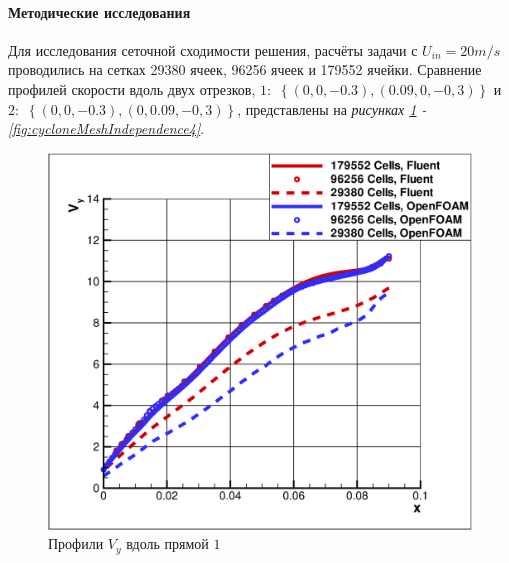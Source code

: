   \paragraph{Методические исследования\\}

  Для исследования сеточной сходимости решения, расчёты задачи с  $U_{in} = 20m/s$ проводились на сетках 29380 ячеек, 96256 ячеек и 179552 ячейки. Сравнение профилей скорости вдоль двух отрезков, $1:$ $\left\{\left(0, 0, -0.3\right),\left(0.09, 0, -0,3\right)\right\}$ и $2:$ $\left\{\left(0, 0, -0.3\right),\left(0, 0.09, -0,3\right)\right\}$, представлены на \textit{рисунках \ref{fig:cycloneMeshIndependence1} -  \ref{fig:cycloneMeshIndependence4}}.
 \begin{figure}[h]
	\vspace{-1em}
	\begin{minipage}{0.475\linewidth}
		\includegraphics[scale=0.33]{cycloneMeshIndependence1}
		\caption{Профили $V_y$ вдоль прямой $1$}
		\label{fig:cycloneMeshIndependence1}
	\end{minipage}
	\hspace{0.5em}
	\begin{minipage}{0.475\linewidth}

\end{minipage}
\end{figure}
